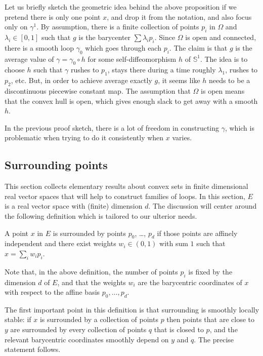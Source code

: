 Let us briefly sketch the geometric idea behind the above proposition
if we pretend there is only one point $x$, and drop it from the
notation, and also focus only on $γ^1$.
By assumption, there is a finite collection of points $p_i$ in $Ω$ and $λ_i ∈
[0, 1]$ such that $g$ is the barycenter $\sum λ_i p_i$. Since $Ω$ is open and
connected, there is a smooth loop $γ_0$ which goes through each $p_i$. The
claim is that $g$ is the average value of $γ = γ_0 ∘ h$ for some
self-diffeomorphism $h$ of $𝕊^1$. The idea is to choose $h$ such that
$γ$ rushes to $p_1$, stays there during a time roughly $λ_1$, rushes to
$p_2$, etc. But, in order to achieve average exactly $g$, it seems like $h$
needs to be a discontinuous piecewise constant map. The assumption that $Ω$ is
open means that the convex hull is open, which gives enough slack to get away with
a smooth $h$.

In the previous proof sketch, there is a lot of freedom in constructing $γ$,
which is problematic when trying to do it consistently when $x$ varies.

\subsection{Surrounding points}
\label{sec:preliminaries}

This section collects elementary results about convex sets in finite
dimensional real vector spaces that will help to construct families of loops.
In this section, $E$ is a real vector space with (finite) dimension $d$.
The discussion will center around the following definition which is tailored to
our ulterior needs.

\begin{definition}
  \label{def:surrounds_points}
  \leanok
  A point $x$ in $E$
  is surrounded by points $p_0$, \dots, $p_d$ if those points are
  affinely independent and there exist weights $w_i ∈ (0, 1)$ with sum $1$
  such that $x = \sum_i w_i p_i$.
\end{definition}

Note that, in the above definition, the number of points $p_i$ is fixed
by the dimension $d$ of $E$, and that the weights $w_i$ are the barycentric
coordinates of $x$ with respect to the affine basis $p_0, \ldots, p_d$.

The first important point in this definition is that surrounding is
smoothly locally stable: if $x$ is surrounded by a collection of points $p$
then points that are close to $y$ are surrounded by every collection of points
$q$ that is closed to $p$, and the relevant barycentric coordinates smoothly
depend on $y$ and $q$. The precise statement follows.

